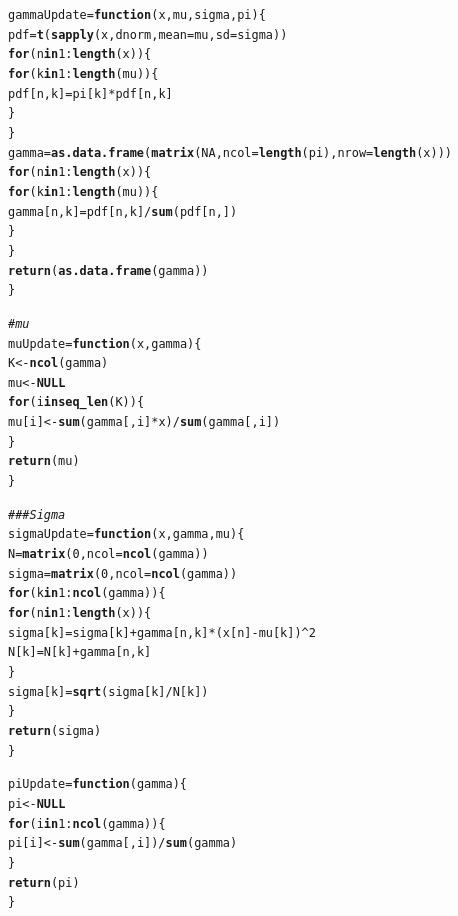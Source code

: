 \documentclass{article}\usepackage[]{graphicx}\usepackage[]{color}
\makeatletter
\newcommand{\hlnum}[1]{\textcolor[rgb]{0.686,0.059,0.569}{#1}}%
\newcommand{\hlcom}[1]{\textcolor[rgb]{0.678,0.584,0.686}{\textit{#1}}}%
\newcommand{\hlopt}[1]{\textcolor[rgb]{0,0,0}{#1}}%
\newcommand{\hlstd}[1]{\textcolor[rgb]{0.345,0.345,0.345}{#1}}%
\newcommand{\hlkwa}[1]{\textcolor[rgb]{0.161,0.373,0.58}{\textbf{#1}}}%
\newcommand{\hlkwb}[1]{\textcolor[rgb]{0.69,0.353,0.396}{#1}}%
\newcommand{\hlkwc}[1]{\textcolor[rgb]{0.333,0.667,0.333}{#1}}%
\newcommand{\hlkwd}[1]{\textcolor[rgb]{0.737,0.353,0.396}{\textbf{#1}}}%
\newenvironment{kframe}{%
 \def\at@end@of@kframe{}%
 \ifinner\ifhmode%
  \def\at@end@of@kframe{\end{minipage}}%
  \begin{minipage}{\columnwidth}%
 \fi\fi%
 \def\FrameCommand##1{\hskip\@totalleftmargin \hskip-\fboxsep
 \colorbox{shadecolor}{##1}\hskip-\fboxsep
     \hskip-\linewidth \hskip-\@totalleftmargin \hskip\columnwidth}%
 \MakeFramed {\advance\hsize-\width
   \@totalleftmargin\z@ \linewidth\hsize
   \@setminipage}}%
 {\par\unskip\endMakeFramed%
 \at@end@of@kframe}
\newenvironment{knitrout}{}{} %
\makeatother
\begin{document}
\begin{knitrout}
\begin{kframe}
\begin{alltt}
\hlstd{gammaUpdate} \hlkwb{=} \hlkwa{function}\hlstd{(}\hlkwc{x}\hlstd{,} \hlkwc{mu}\hlstd{,} \hlkwc{sigma}\hlstd{,} \hlkwc{pi}\hlstd{)\{}
  \hlstd{pdf} \hlkwb{=} \hlkwd{t}\hlstd{(}\hlkwd{sapply}\hlstd{(x, dnorm,} \hlkwc{mean} \hlstd{= mu,} \hlkwc{sd} \hlstd{= sigma))}
  \hlkwa{for}\hlstd{(n} \hlkwa{in} \hlnum{1}\hlopt{:}\hlkwd{length}\hlstd{(x))\{}
    \hlkwa{for}\hlstd{(k} \hlkwa{in} \hlnum{1}\hlopt{:}\hlkwd{length}\hlstd{(mu))\{}
      \hlstd{pdf[n, k]} \hlkwb{=} \hlstd{pi[k]}\hlopt{*}\hlstd{pdf[n, k]}
    \hlstd{\}}
  \hlstd{\}}
  \hlstd{gamma} \hlkwb{=} \hlkwd{as.data.frame}\hlstd{(}\hlkwd{matrix}\hlstd{(}\hlnum{NA}\hlstd{,} \hlkwc{ncol} \hlstd{=} \hlkwd{length}\hlstd{(pi),} \hlkwc{nrow} \hlstd{=} \hlkwd{length}\hlstd{(x)))}
  \hlkwa{for}\hlstd{(n} \hlkwa{in} \hlnum{1}\hlopt{:}\hlkwd{length}\hlstd{(x))\{}
    \hlkwa{for}\hlstd{(k} \hlkwa{in} \hlnum{1}\hlopt{:}\hlkwd{length}\hlstd{(mu))\{}
      \hlstd{gamma[n, k]} \hlkwb{=} \hlstd{pdf[n, k]}\hlopt{/}\hlkwd{sum}\hlstd{(pdf[n,])}
    \hlstd{\}}
  \hlstd{\}}
  \hlkwd{return}\hlstd{(}\hlkwd{as.data.frame}\hlstd{(gamma))}
\hlstd{\}}

\hlcom{# mu}
\hlstd{muUpdate} \hlkwb{=} \hlkwa{function}\hlstd{(}\hlkwc{x}\hlstd{,} \hlkwc{gamma}\hlstd{)\{}
  \hlstd{K} \hlkwb{<-} \hlkwd{ncol}\hlstd{(gamma)}
  \hlstd{mu} \hlkwb{<-} \hlkwa{NULL}
  \hlkwa{for} \hlstd{(i} \hlkwa{in} \hlkwd{seq_len}\hlstd{(K)) \{}
    \hlstd{mu[i]} \hlkwb{<-} \hlkwd{sum}\hlstd{(gamma[,i]}\hlopt{*}\hlstd{x)}\hlopt{/}\hlkwd{sum}\hlstd{(gamma[,i])}
  \hlstd{\}}
  \hlkwd{return}\hlstd{(mu)}
\hlstd{\}}

\hlcom{### Sigma}
\hlstd{sigmaUpdate} \hlkwb{=} \hlkwa{function}\hlstd{(}\hlkwc{x}\hlstd{,} \hlkwc{gamma}\hlstd{,} \hlkwc{mu}\hlstd{)\{}
  \hlstd{N} \hlkwb{=} \hlkwd{matrix}\hlstd{(}\hlnum{0}\hlstd{,} \hlkwc{ncol}\hlstd{=} \hlkwd{ncol}\hlstd{(gamma))}
  \hlstd{sigma} \hlkwb{=} \hlkwd{matrix}\hlstd{(}\hlnum{0}\hlstd{,} \hlkwc{ncol} \hlstd{=} \hlkwd{ncol}\hlstd{(gamma))}
  \hlkwa{for}\hlstd{(k} \hlkwa{in} \hlnum{1}\hlopt{:}\hlkwd{ncol}\hlstd{(gamma))\{}
    \hlkwa{for}\hlstd{(n} \hlkwa{in} \hlnum{1}\hlopt{:}\hlkwd{length}\hlstd{(x))\{}
      \hlstd{sigma[k]} \hlkwb{=} \hlstd{sigma[k]} \hlopt{+} \hlstd{gamma[n,k]}\hlopt{*}\hlstd{(x[n]}\hlopt{-}\hlstd{mu[k])}\hlopt{^}\hlnum{2}
      \hlstd{N[k]} \hlkwb{=} \hlstd{N[k]} \hlopt{+} \hlstd{gamma[n,k]}
    \hlstd{\}}
    \hlstd{sigma[k]} \hlkwb{=} \hlkwd{sqrt}\hlstd{(sigma[k]}\hlopt{/}\hlstd{N[k])}
  \hlstd{\}}
  \hlkwd{return}\hlstd{(sigma)}
\hlstd{\}}

\hlstd{piUpdate} \hlkwb{=} \hlkwa{function}\hlstd{(}\hlkwc{gamma}\hlstd{)\{}
  \hlstd{pi} \hlkwb{<-} \hlkwa{NULL}
  \hlkwa{for} \hlstd{(i} \hlkwa{in} \hlnum{1}\hlopt{:}\hlkwd{ncol}\hlstd{(gamma)) \{}
    \hlstd{pi[i]} \hlkwb{<-} \hlkwd{sum}\hlstd{(gamma[,i])}\hlopt{/}\hlkwd{sum}\hlstd{(gamma)}
  \hlstd{\}}
  \hlkwd{return}\hlstd{(pi)}
\hlstd{\}}


\end{alltt}
\end{kframe}
\end{knitrout}
\end{document}
